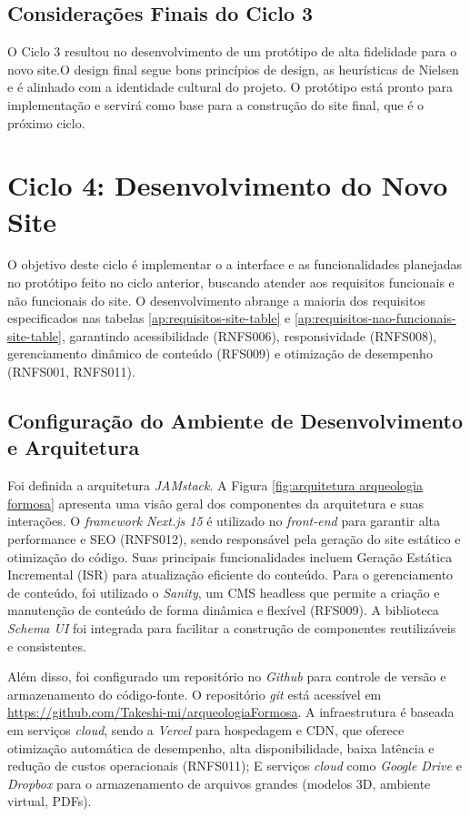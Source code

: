 \subsection*{Considerações Finais do Ciclo 3}
O Ciclo 3 resultou no desenvolvimento de um protótipo de alta fidelidade para o novo site.O design final segue bons princípios de design, as heurísticas de Nielsen e é alinhado com a identidade cultural do projeto. O protótipo está pronto para implementação e servirá como base para a construção do site final, que é o próximo ciclo. 

\section{Ciclo 4: Desenvolvimento do Novo Site}
\label{sec:ciclo4_desenvolvimento}

O objetivo deste ciclo é implementar o a interface e as funcionalidades planejadas no protótipo feito no ciclo anterior, buscando atender aos requisitos funcionais e não funcionais do site. O desenvolvimento abrange a maioria dos requisitos especificados nas tabelas \ref{ap:requisitos-site-table} e \ref{ap:requisitos-nao-funcionais-site-table}, garantindo acessibilidade (RNFS006), responsividade (RNFS008), gerenciamento dinâmico de conteúdo (RFS009) e otimização de desempenho (RNFS001, RNFS011).

    \subsection{Configuração do Ambiente de Desenvolvimento e Arquitetura}
     Foi definida a arquitetura \textit{JAMstack}. A Figura \ref{fig:arquitetura arqueologia formosa} apresenta uma visão geral dos componentes da arquitetura e suas interações. O \textit{framework} \textit{Next.js 15} é utilizado no \textit{front-end} para garantir alta performance e SEO (RNFS012), sendo responsável pela geração do site estático e otimização do código. Suas principais funcionalidades incluem Geração Estática Incremental (ISR) para atualização eficiente do conteúdo.
     Para o gerenciamento de conteúdo, foi utilizado o \textit{Sanity}, um CMS headless que permite a criação e manutenção de conteúdo de forma dinâmica e flexível (RFS009). A biblioteca \textit{Schema UI} foi integrada para facilitar a construção de componentes reutilizáveis e consistentes. 
     
     Além disso, foi configurado um repositório no \textit{Github} para controle de versão e armazenamento do código-fonte. O repositório \textit{git} está acessível em \href{https://github.com/Takeshi-mi/arqueologiaFormosa}{https://github.com/Takeshi-mi/arqueologiaFormosa}. 
     A infraestrutura é baseada em serviços \textit{cloud}, sendo a \textit{Vercel} para hospedagem e CDN, que oferece otimização automática de desempenho, alta disponibilidade, baixa latência e redução de custos operacionais (RNFS011);
     E serviços \textit{cloud} como \textit{Google Drive} e \textit{Dropbox} para o armazenamento de arquivos grandes (modelos 3D, ambiente virtual, PDFs).

